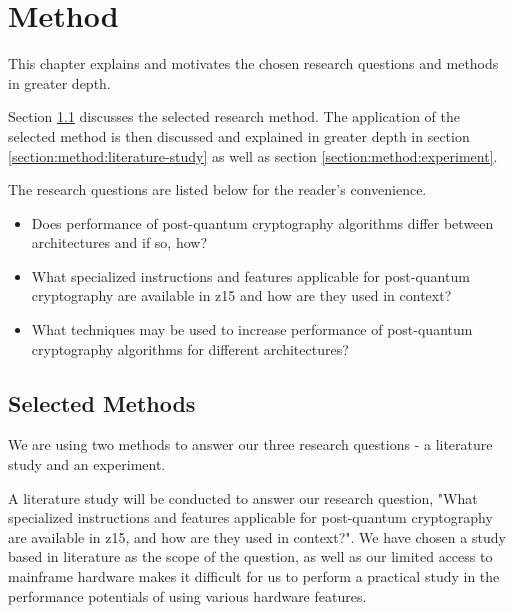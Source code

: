 \chapter{Method}
\label{chapter:method}

This chapter explains and motivates the chosen research questions and methods in greater depth.

Section \ref{section:method:selected-method} discusses the selected research method. The application of the selected method is then discussed and explained in greater depth in section \ref{section:method:literature-study} as well as section \ref{section:method:experiment}.

The research questions are listed below for the reader's convenience.

\begin{itemize}
    \item Does performance of \gls{post-quantum} cryptography algorithms differ between architectures and if so, how?
    \item What specialized instructions and features applicable for \gls{post-quantum} cryptography are available in \gls{z15} and how are they used in context?
    \item What techniques may be used to increase performance of \gls{post-quantum} cryptography algorithms for different architectures?
\end{itemize}

\section{Selected Methods}
\label{section:method:selected-method}

We are using two methods to answer our three research questions - a literature study and an experiment.

A literature study will be conducted to answer our research question, "What specialized instructions and features applicable for post-quantum cryptography are available in \gls{z15}, and how are they used in context?". We have chosen a study based in literature as the scope of the question, as well as our limited access to mainframe hardware makes it difficult for us to perform a practical study in the performance potentials of using various hardware features.

